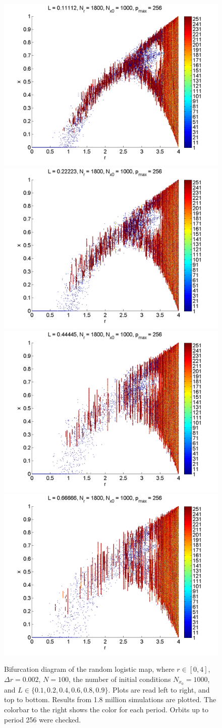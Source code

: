 \begin{figure}[H]\linespread{1}
\caption[Bifurcation diagram of the random logistic map, high resolution]{Bifurcation diagram of the random
logistic map, where $r \in [0,4]$, $\Delta r = 0.002$, $N=100$, the
number of initial conditions $N_{x_0}=1000$, and $L\in
\{0.1,0.2,0.4,0.6,0.8,0.9\}$. Plots are read left to right, and top to
bottom. Results from 1.8 million simulations are plotted. The colorbar
to the right shows the color for each period. Orbits up to period 256 were checked.}\label{fig:rlogbif}
	\begin{center}
		\includegraphics[width=.5\textwidth]{figs/rlog_bif_L_01.png}\hfill
		\includegraphics[width=.5\textwidth]{figs/rlog_bif_L_02.png}\\
		\includegraphics[width=.5\textwidth]{figs/rlog_bif_L_04.png}\hfill
		\includegraphics[width=.5\textwidth]{figs/rlog_bif_L_06.png}\\

\end{center}
\end{figure}
